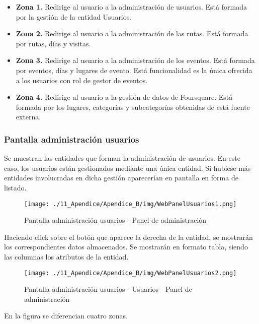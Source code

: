 \begin{itemize}
	\item \textbf{Zona 1. }Redirige al usuario a la administración de usuarios. Está formada por la gestión de la entidad Usuarios.
	\item \textbf{Zona 2. }Redirige al usuario a la administración de las rutas. Está formada por rutas, días y visitas.
	\item \textbf{Zona 3. }Redirige al usuario a la administración de los eventos. Está formada por eventos, días y lugares de evento. Está funcionalidad es la única ofrecida a los usuarios con rol de gestor de eventos.
	\item \textbf{Zona 4. }Redirige al usuario a la gestión de datos de Foursquare. Está formada por los lugares, categorías y subcategorías obtenidas de está fuente externa.
\end{itemize}


\subsubsection*{Pantalla administración usuarios}
Se muestran las entidades que forman la administración de usuarios. En este caso, los usuarios están gestionados mediante una única entidad. Si hubiese más entidades involucradas en dicha gestión aparecerían en pantalla en forma de listado.

\begin{figure}[H]
\centering
\texttt{[image: ./11\_Apendice/Apendice\_B/img/WebPanelUsuarios1.png]}
\caption{Pantalla administración usuarios - Panel de administración}
\end{figure}

Haciendo click sobre el botón que aparece la derecha de la entidad, se mostrarán los correspondientes datos almacenados. Se mostrarán en formato tabla, siendo las columnas los atributos de la entidad.


\begin{figure}[H]
\centering
\texttt{[image: ./11\_Apendice/Apendice\_B/img/WebPanelUsuarios2.png]}
\caption{Pantalla administración usuarios - Usuarios - Panel de administración}
\end{figure}

En la figura se diferencian cuatro zonas.


